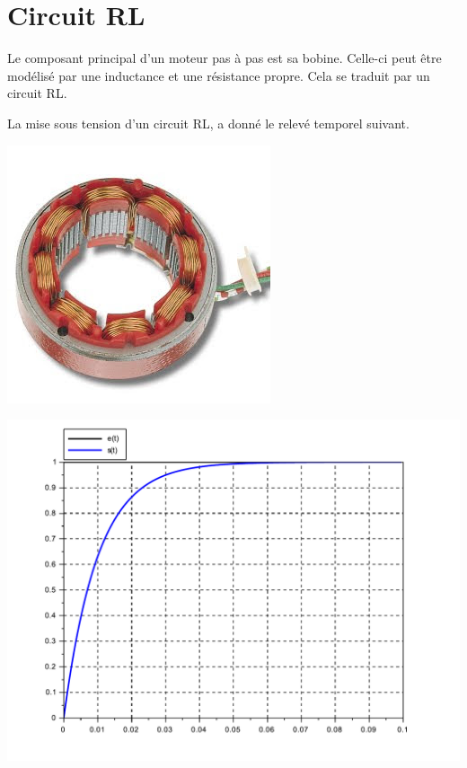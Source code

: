 

\section{Circuit RL}

\begin{minipage}{0.48\linewidth}
Le composant principal d'un moteur pas à pas est sa bobine. Celle-ci peut être modélisé par une inductance et une résistance propre. Cela se traduit par un circuit RL.

La mise sous tension d'un circuit RL, a donné le relevé temporel suivant.
\end{minipage}\hfill
\begin{minipage}{0.48\linewidth}
\begin{center}
 \includegraphics[width=0.7\linewidth]{img/fig1}
\end{center}
\end{minipage}

\begin{center}
 \includegraphics[width=0.7\linewidth]{img/01}
\end{center}

